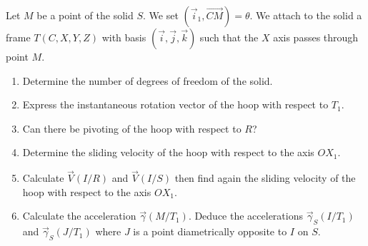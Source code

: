 \documentclass[12pt]{article}
\begin{document}
Let $M$ be a point of the solid $S$. We set $(\vec{i}_1, \overrightarrow{CM}) = \theta$. We attach to the solid a frame $T(C, X, Y, Z)$ with basis $(\vec{i}, \vec{j}, \vec{k})$ such that the $X$ axis passes through point $M$.

\begin{enumerate}
    \item Determine the number of degrees of freedom of the solid.
    \item Express the instantaneous rotation vector of the hoop with respect to $T_1$.
    \item Can there be pivoting of the hoop with respect to $R$?
    \item Determine the sliding velocity of the hoop with respect to the axis $OX_1$.
    \item Calculate $\vec{V}(I/R)$ and $\vec{V}(I/S)$ then find again the sliding velocity of the hoop with respect to the axis $OX_1$.
    \item Calculate the acceleration $\vec{\gamma}(M/T_1)$. Deduce the accelerations $\vec{\gamma}_S(I/T_1)$ and $\vec{\gamma}_S(J/T_1)$ where $J$ is a point diametrically opposite to $I$ on $S$.
\end{enumerate}
\end{document}
